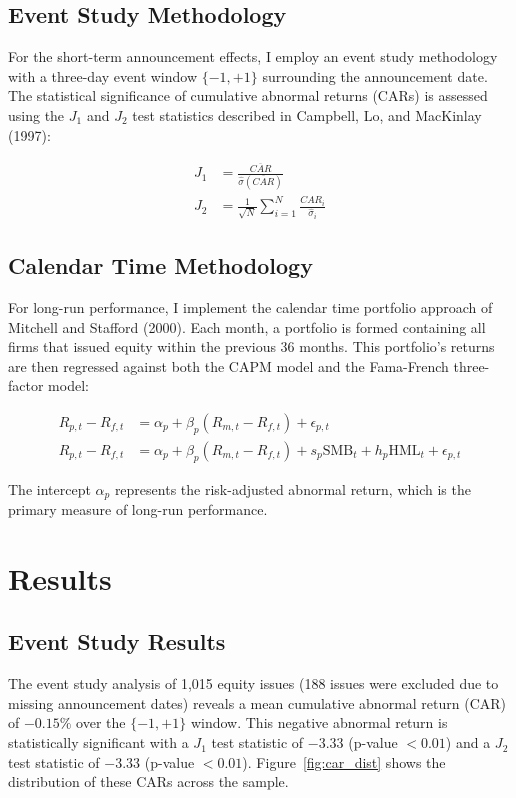 \documentclass[12pt]{article}
\begin{document}
\subsection{Event Study Methodology}
For the short-term announcement effects, I employ an event study methodology with a three-day event window $\{-1,+1\}$ surrounding the announcement date. The statistical significance of cumulative abnormal returns (CARs) is assessed using the $J_1$ and $J_2$ test statistics described in Campbell, Lo, and MacKinlay (1997):

\begin{align}
J_1 &= \frac{\overline{CAR}}{\hat{\sigma}(\overline{CAR})} \\
J_2 &= \frac{1}{\sqrt{N}}\sum_{i=1}^{N}\frac{CAR_i}{\hat{\sigma}_i}
\end{align}

\subsection{Calendar Time Methodology}
For long-run performance, I implement the calendar time portfolio approach of Mitchell and Stafford (2000). Each month, a portfolio is formed containing all firms that issued equity within the previous 36 months. This portfolio's returns are then regressed against both the CAPM model and the Fama-French three-factor model:

\begin{align}
R_{p,t} - R_{f,t} &= \alpha_p + \beta_p(R_{m,t} - R_{f,t}) + \epsilon_{p,t} \\
R_{p,t} - R_{f,t} &= \alpha_p + \beta_p(R_{m,t} - R_{f,t}) + s_p\text{SMB}_t + h_p\text{HML}_t + \epsilon_{p,t}
\end{align}

The intercept $\alpha_p$ represents the risk-adjusted abnormal return, which is the primary measure of long-run performance.

\section{Results}

\subsection{Event Study Results}

The event study analysis of 1,015 equity issues (188 issues were excluded due to missing announcement dates) reveals a mean cumulative abnormal return (CAR) of $-0.15\%$ over the $\{-1,+1\}$ window. This negative abnormal return is statistically significant with a $J_1$ test statistic of $-3.33$ (p-value $< 0.01$) and a $J_2$ test statistic of $-3.33$ (p-value $< 0.01$). Figure~\ref{fig:car_dist} shows the distribution of these CARs across the sample.
\end{document}
